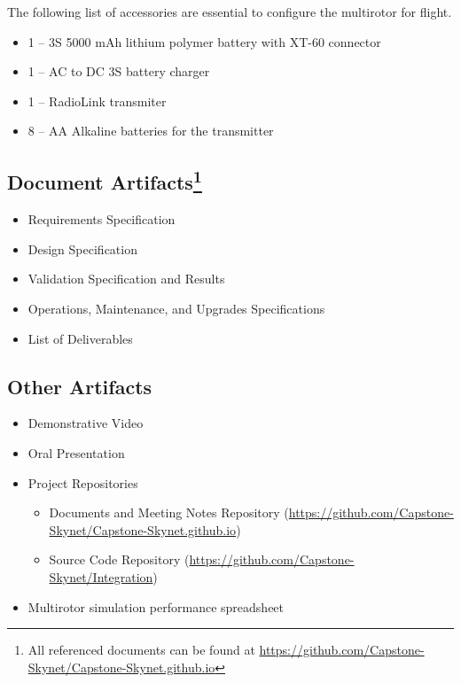 \documentclass[10pt,letterpaper]{article}
\begin{document}
The following list of accessories are essential to configure the multirotor for flight.

\begin{itemize}
\item 1 -- 3S 5000 mAh lithium polymer battery with XT-60 connector
\item 1 -- AC to DC 3S battery charger
\item 1 -- RadioLink transmiter
\item 8 -- AA Alkaline batteries for the transmitter
\end{itemize}


\subsection[Document Artifacts]{Document Artifacts\footnote{All referenced documents can be found at \url{https://github.com/Capstone-Skynet/Capstone-Skynet.github.io}}}

\begin{itemize}
\item Requirements Specification
\item Design Specification
\item Validation Specification and Results
\item Operations, Maintenance, and Upgrades Specifications
\item List of Deliverables
\end{itemize}

\subsection{Other Artifacts}
\begin{itemize}
\item Demonstrative Video
\item Oral Presentation
\item Project Repositories
\begin{itemize}
    \item Documents and Meeting Notes Repository ({\url{https://github.com/Capstone-Skynet/Capstone-Skynet.github.io}})
    \item Source Code Repository ({\url{https://github.com/Capstone-Skynet/Integration}})
\end{itemize}
\item Multirotor simulation performance spreadsheet
\end{itemize}

\end{document}
